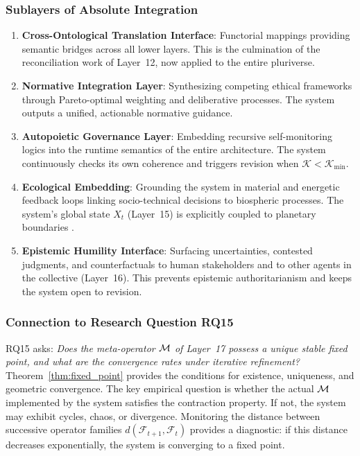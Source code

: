 \subsubsection{Sublayers of Absolute Integration}
\begin{enumerate}
    \item \textbf{Cross-Ontological Translation Interface}: Functorial mappings providing semantic bridges across all lower layers. This is the culmination of the reconciliation work of Layer~12, now applied to the entire pluriverse.
    \item \textbf{Normative Integration Layer}: Synthesizing competing ethical frameworks through Pareto-optimal weighting and deliberative processes. The system outputs a unified, actionable normative guidance.
    \item \textbf{Autopoietic Governance Layer}: Embedding recursive self-monitoring logics into the runtime semantics of the entire architecture. The system continuously checks its own coherence and triggers revision when $\mathcal{K} < \mathcal{K}_{\text{min}}$.
    \item \textbf{Ecological Embedding}: Grounding the system in material and energetic feedback loops linking socio-technical decisions to biospheric processes. The system's global state $X_t$ (Layer~15) is explicitly coupled to planetary boundaries \cite{rockstrom2009planetary}.
    \item \textbf{Epistemic Humility Interface}: Surfacing uncertainties, contested judgments, and counterfactuals to human stakeholders and to other agents in the collective (Layer~16). This prevents epistemic authoritarianism and keeps the system open to revision.
\end{enumerate}

\subsubsection{Connection to Research Question RQ15}
RQ15 asks: \emph{Does the meta-operator $\mathcal{M}$ of Layer~17 possess a unique stable fixed point, and what are the convergence rates under iterative refinement?} Theorem~\ref{thm:fixed_point} provides the conditions for existence, uniqueness, and geometric convergence. The key empirical question is whether the actual $\mathcal{M}$ implemented by the system satisfies the contraction property. If not, the system may exhibit cycles, chaos, or divergence. Monitoring the distance between successive operator families $d(\mathcal{F}_{t+1}, \mathcal{F}_t)$ provides a diagnostic: if this distance decreases exponentially, the system is converging to a fixed point.

